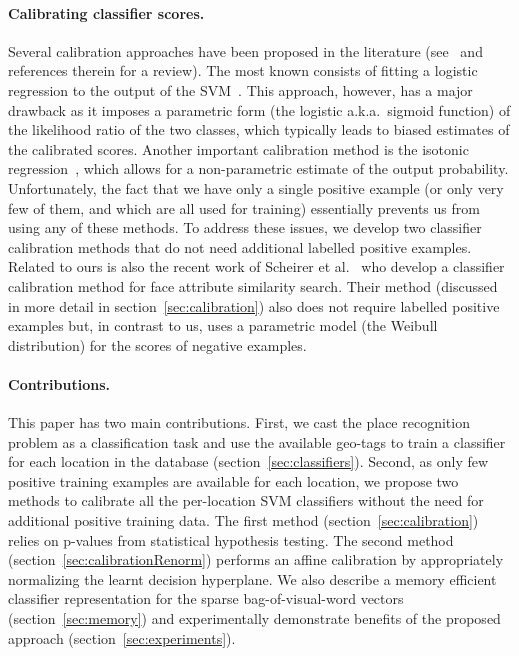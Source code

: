 \paragraph{Calibrating classifier scores.} 
 Several calibration approaches have been proposed in the literature (see~\cite{gebel2007calibrating} and references therein for a review). The most known consists of fitting a logistic regression to the output of the SVM~\cite{Platt99}.  This approach, however, has a major drawback as it imposes a parametric form (the logistic a.k.a.\ sigmoid function) of the likelihood ratio of the two classes, which typically leads to biased estimates of the calibrated scores. Another important calibration method is the isotonic regression~\cite{zadrozny2002transforming}, which allows for a non-parametric estimate of the output probability.
   Unfortunately, the fact that we have only a single positive example
   (or only very few of them, and which are all used for training)
    essentially prevents us from using any of these methods. 
To address these issues, we develop two classifier calibration methods that do not need additional labelled positive examples.
Related to ours is also the recent work of Scheirer et al.~\cite{Scheirer12} who develop a classifier calibration method for face attribute similarity search.
Their method (discussed in more detail in section~\ref{sec:calibration}) also does not require labelled positive examples but, in contrast to us, uses a parametric model (the Weibull distribution) for the scores of negative examples.    


\paragraph{Contributions.} 
This paper has two main contributions. First, we cast the place recognition problem as a classification task and use the available geo-tags to train a classifier for each location in the database (section~\ref{sec:classifiers}). Second, as only few positive training examples are available for each location, we propose two methods to calibrate all the per-location SVM classifiers without the need for additional positive training data. The first method (section~\ref{sec:calibration}) relies on p-values from statistical hypothesis testing. The second method (section~\ref{sec:calibrationRenorm}) performs an affine calibration by appropriately normalizing the learnt decision hyperplane. 
We also describe a memory efficient classifier representation for the sparse bag-of-visual-word vectors (section~\ref{sec:memory}) and experimentally demonstrate benefits
of the proposed approach (section~\ref{sec:experiments}). 

